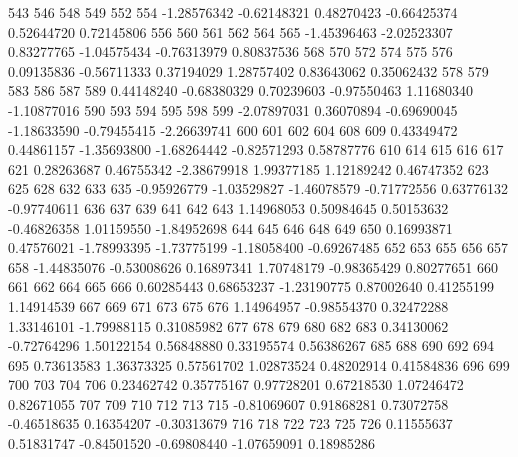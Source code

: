 \documentclass{article}
\begin{document}
\begin{Schunk}
\begin{Soutput}
        543         546         548         549         552         554 
-1.28576342 -0.62148321  0.48270423 -0.66425374  0.52644720  0.72145806 
        556         560         561         562         564         565 
-1.45396463 -2.02523307  0.83277765 -1.04575434 -0.76313979  0.80837536 
        568         570         572         574         575         576 
 0.09135836 -0.56711333  0.37194029  1.28757402  0.83643062  0.35062432 
        578         579         583         586         587         589 
 0.44148240 -0.68380329  0.70239603 -0.97550463  1.11680340 -1.10877016 
        590         593         594         595         598         599 
-2.07897031  0.36070894 -0.69690045 -1.18633590 -0.79455415 -2.26639741 
        600         601         602         604         608         609 
 0.43349472  0.44861157 -1.35693800 -1.68264442 -0.82571293  0.58787776 
        610         614         615         616         617         621 
 0.28263687  0.46755342 -2.38679918  1.99377185  1.12189242  0.46747352 
        623         625         628         632         633         635 
-0.95926779 -1.03529827 -1.46078579 -0.71772556  0.63776132 -0.97740611 
        636         637         639         641         642         643 
 1.14968053  0.50984645  0.50153632 -0.46826358  1.01159550 -1.84952698 
        644         645         646         648         649         650 
 0.16993871  0.47576021 -1.78993395 -1.73775199 -1.18058400 -0.69267485 
        652         653         655         656         657         658 
-1.44835076 -0.53008626  0.16897341  1.70748179 -0.98365429  0.80277651 
        660         661         662         664         665         666 
 0.60285443  0.68653237 -1.23190775  0.87002640  0.41255199  1.14914539 
        667         669         671         673         675         676 
 1.14964957 -0.98554370  0.32472288  1.33146101 -1.79988115  0.31085982 
        677         678         679         680         682         683 
 0.34130062 -0.72764296  1.50122154  0.56848880  0.33195574  0.56386267 
        685         688         690         692         694         695 
 0.73613583  1.36373325  0.57561702  1.02873524  0.48202914  0.41584836 
        696         699         700         703         704         706 
 0.23462742  0.35775167  0.97728201  0.67218530  1.07246472  0.82671055 
        707         709         710         712         713         715 
-0.81069607  0.91868281  0.73072758 -0.46518635  0.16354207 -0.30313679 
        716         718         722         723         725         726 
 0.11555637  0.51831747 -0.84501520 -0.69808440 -1.07659091  0.18985286 

\end{Soutput}
\end{Schunk}
\end{document}
